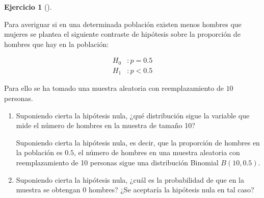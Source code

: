 \documentclass[
  a4paper,
]{scrreport}
\theoremstyle{definition}
\newtheorem{exercise}{Ejercicio}[chapter]
\theoremstyle{remark}
\begin{document}
\begin{exercise}[]\protect\hypertarget{exr-contraste-hipotesis-proporcion-hombres}{}\label{exr-contraste-hipotesis-proporcion-hombres}

Para averiguar si en una determinada población existen menos hombres que
mujeres se plantea el siguiente contraste de hipótesis sobre la
proporción de hombres que hay en la población:

\begin{align*}
H_0 &: p=0.5\\
H_1 &: p<0.5 
\end{align*}

Para ello se ha tomado una muestra aleatoria con reemplazamiento de
\(10\) personas.

\begin{enumerate}
\def\labelenumi{\alph{enumi}.}
\item
  Suponiendo cierta la hipótesis nula, ¿qué distribución sigue la
  variable que mide el número de hombres en la muestra de tamaño 10?

  \begin{tcolorbox}[enhanced jigsaw, breakable, toptitle=1mm, colbacktitle=quarto-callout-tip-color!10!white, rightrule=.15mm, opacityback=0, opacitybacktitle=0.6, titlerule=0mm, coltitle=black, colframe=quarto-callout-tip-color-frame, colback=white, bottomtitle=1mm, leftrule=.75mm, toprule=.15mm, title=\textcolor{quarto-callout-tip-color}{\faLightbulb}\hspace{0.5em}{Solución}, arc=.35mm, bottomrule=.15mm, left=2mm]

  Suponiendo cierta la hipótesis nula, es decir, que la proporción de
  hombres en la población es \(0.5\), el número de hombres en una
  muestra aleatoria con reemplazamiento de 10 personas sigue una
  distribución Binomial \(B(10, 0.5)\).

  \end{tcolorbox}
\item
  Suponiendo cierta la hipótesis nula, ¿cuál es la probabilidad de que
  en la muestra se obtengan 0 hombres? ¿Se aceptaría la hipótesis nula
  en tal caso?

  \begin{tcolorbox}[enhanced jigsaw, breakable, toptitle=1mm, colbacktitle=quarto-callout-tip-color!10!white, rightrule=.15mm, opacityback=0, opacitybacktitle=0.6, titlerule=0mm, coltitle=black, colframe=quarto-callout-tip-color-frame, colback=white, bottomtitle=1mm, leftrule=.75mm, toprule=.15mm, title=\textcolor{quarto-callout-tip-color}{\faLightbulb}\hspace{0.5em}{Solución}, arc=.35mm, bottomrule=.15mm, left=2mm]


\end{tcolorbox}
\end{enumerate}
\end{exercise}
\end{document}
